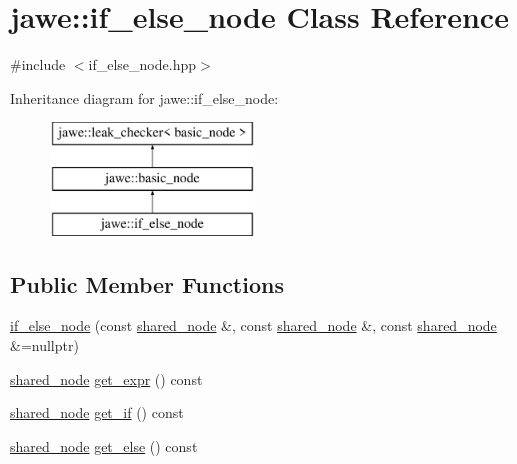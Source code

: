 \hypertarget{classjawe_1_1if__else__node}{}\section{jawe\+:\+:if\+\_\+else\+\_\+node Class Reference}
\label{classjawe_1_1if__else__node}


{\ttfamily \#include $<$if\+\_\+else\+\_\+node.\+hpp$>$}

Inheritance diagram for jawe\+:\+:if\+\_\+else\+\_\+node\+:\begin{figure}[H]
\begin{center}
\leavevmode
\includegraphics[height=3.000000cm]{classjawe_1_1if__else__node}
\end{center}
\end{figure}
\subsection*{Public Member Functions}
\begin{DoxyCompactItemize}
\item 
\hyperlink{classjawe_1_1if__else__node_a3ca222c371220791781da434b4454413}{if\+\_\+else\+\_\+node} (const \hyperlink{namespacejawe_a3f307481d921b6cbb50cc8511fc2b544}{shared\+\_\+node} \&, const \hyperlink{namespacejawe_a3f307481d921b6cbb50cc8511fc2b544}{shared\+\_\+node} \&, const \hyperlink{namespacejawe_a3f307481d921b6cbb50cc8511fc2b544}{shared\+\_\+node} \&=nullptr)
\item 
\hyperlink{namespacejawe_a3f307481d921b6cbb50cc8511fc2b544}{shared\+\_\+node} \hyperlink{classjawe_1_1if__else__node_a8339d4fc28c66e06c5f5e94081b5427a}{get\+\_\+expr} () const
\item 
\hyperlink{namespacejawe_a3f307481d921b6cbb50cc8511fc2b544}{shared\+\_\+node} \hyperlink{classjawe_1_1if__else__node_aba0d6d7b1e6c3aeacbcf83ac0ccdc799}{get\+\_\+if} () const
\item 
\hyperlink{namespacejawe_a3f307481d921b6cbb50cc8511fc2b544}{shared\+\_\+node} \hyperlink{classjawe_1_1if__else__node_a87e1ae4d09eb009122570ec9f5b3f707}{get\+\_\+else} () const
\end{DoxyCompactItemize}
